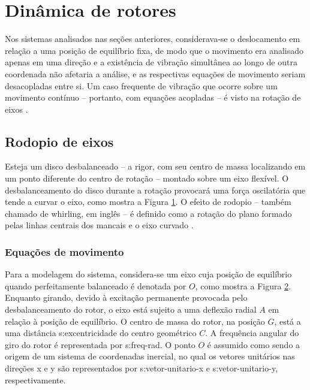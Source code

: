 \documentclass[12pt,openright,oneside,a4paper,
	chapter=TITLE,section=TITLE,
	english,brazil]{abntex2}
\begin{document}
	\section{Dinâmica de rotores}
	Nos sistemas analisados nas seções anteriores, considerava-se o deslocamento em relação a uma posição de equilíbrio fixa, de modo que o movimento era analisado apenas em uma direção e a existência de vibração simultânea ao longo de outra coordenada não afetaria a análise, e as respectivas equações de movimento seriam desacopladas entre si. Um caso frequente de vibração que ocorre sobre um movimento contínuo -- portanto, com equações acopladas -- é visto na rotação de eixos \cite{dimarogonas:1995}.

	\subsection{Rodopio de eixos}
	Esteja um disco desbalanceado -- a rigor, com seu centro de massa localizando em um ponto diferente do centro de rotação -- montado sobre um eixo flexível. O desbalanceamento do disco durante a rotação provocará uma força oscilatória que tende a curvar o eixo, como mostra a Figura \ref{fig:whirl-eixo}. O efeito de rodopio -- também chamado de \foreignlanguage{english}{whirling}, em inglês -- é definido como a rotação do plano formado pelas linhas centrais dos mancais e o eixo curvado \cite{rao:2008}.
	\begin{figure}[b]
		\label{fig:whirl-eixo}
	\end{figure}

	\subsubsection{Equações de movimento}
	Para a modelagem do sistema, considera-se um eixo cuja posição de equilíbrio quando perfeitamente balanceado é denotada por $\!\mathit{O}$, como mostra a Figura \ref{fig:rotor-excentrico}. Enquanto girando, devido à excitação permanente provocada pelo desbalanceamento do rotor, o eixo está sujeito a uma deflexão radial $\!\mathit{A}$ em relação à posição de equilíbrio. O centro de massa do rotor, na posição $\!\mathit{G}$, está a uma distância \gls{s:excentricidade} do centro geométrico $\!\mathit{C}$. A frequência angular do giro do rotor é representada por \gls{s:freq-rad}. O ponto $\!\mathit{O}$ é assumido como sendo a origem de um sistema de coordenadas inercial, no qual os vetores unitários nas direções x e y são representados por \gls{s:vetor-unitario-x} e \gls{s:vetor-unitario-y}, respectivamente.
	\begin{figure}[h]
		\label{fig:rotor-excentrico}
	\end{figure}
	
\end{document}
